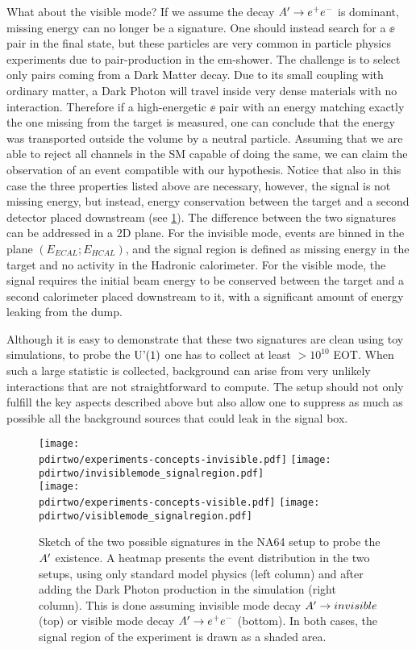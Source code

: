 What about the visible mode? If we assume the decay $A' \to e^+e^-$ is dominant, missing energy can no longer be a signature. One should instead search for a $\ee$ pair in the final state, but these particles are very common in particle physics experiments due to pair-production in the em-shower. The challenge is to select only pairs coming from a Dark Matter decay. Due to its small coupling with ordinary matter, a Dark Photon will travel inside very dense materials with no interaction. Therefore if a high-energetic $\ee$ pair with an energy matching exactly the one missing from the target is measured, one can conclude that the energy was transported outside the volume by a neutral particle. Assuming that we are able to reject all channels in the SM capable of doing the same, we can claim the observation of an event compatible with our hypothesis. Notice that also in this case the three properties listed above are necessary, however, the signal is not missing energy, but instead, energy conservation between the target and a second detector placed downstream (see \ref{fig:two-signature}).
The difference between the two signatures can be addressed in a 2D plane. For the invisible mode, events are binned in the plane $(E_{ECAL};E_{HCAL})$, and the signal region is defined as missing energy in the target and no activity in the Hadronic calorimeter. For the visible mode, the signal requires the initial beam energy to be conserved between the target and a second calorimeter placed downstream to it, with a significant amount of energy leaking from the dump.

Although it is easy to demonstrate that these two signatures are clean using toy simulations, to probe the $\textrm{U'(1)}$ one has to collect at least $>10^{10}$ EOT. When such a large statistic is collected, background can arise from very unlikely interactions that are not straightforward to compute. The setup should not only fulfill the key aspects described above but also allow one to suppress as much as possible all the background sources that could leak in the signal box.

\begin{figure}[bth!]
  \centering
  \texttt{[image: \\pdirtwo/experiments-concepts-invisible.pdf]}
  \texttt{[image: \\pdirtwo/invisiblemode\_signalregion.pdf]} \\
  \texttt{[image: \\pdirtwo/experiments-concepts-visible.pdf]}
  \texttt{[image: \\pdirtwo/visiblemode\_signalregion.pdf]}   
\caption[Sketch of experimental signatures for $\DM$]{Sketch of the two possible signatures in the NA64 setup to probe the $\DM$ existence. A heatmap presents the event distribution in the two setups, using only standard model physics (left column) and after adding the Dark Photon production in the simulation (right column). This is done assuming invisible mode decay $A'\to invisible$ (top) or visible mode decay $A' \to e^+e^-$ (bottom). In both cases, the signal region of the experiment is drawn as a shaded area.}
\label{fig:two-signature}
\end{figure}

